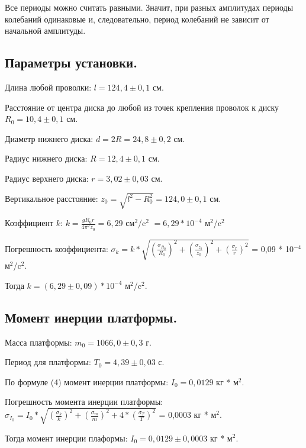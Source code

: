 \documentclass[a4paper]{article}
\begin{document}
    Все периоды можно считать равными. Значит, при разных амплитудах периоды колебаний одинаковые и, следовательно, период колебаний не зависит от начальной амплитуды.

\subsection {Параметры установки.}

\item Длина любой проволки: $l = 124,4 \pm{0,1}$ см.
\item Расстояние от центра диска до любой из точек крепления проволок к диску $R_0 = 10,4 \pm{0,1}$ см.\\
\item Диаметр нижнего диска: $d = 2R = 24,8 \pm{0,2}$ см.
\item Радиус нижнего диска: $R = 12,4 \pm{0,1}$ см.\\
\item Радиус верхнего диска: $r = 3,02 \pm{0,03}$ см.\\
\item Вертикальное расстояние: $z_0 = \sqrt{l^2 - R_0^2} = 124,0 \pm{0,1}$ см.\\

\item Коэффициент $k$: $k = \frac{gR_0r}{4\pi{^2}z_0} = 6,29$ см$^2$/c$^2$ $= 6,29 * 10^{-4}$ м$^2$/c$^2$
\item Погрешность коэффициента: $\sigma_{k} = k * \sqrt{(\frac{\sigma_{R_0}}{R_0})^2 + (\frac{\sigma_{z_0}}{z_0})^2 + (\frac{\sigma_{r}}{r})^2}$ = 0,09 * 10$^{-4}$ м$^2$/c$^2$.\\

\item Тогда $k = (6,29 \pm{0,09}) * 10^{-4}$ м$^2$/c$^2$.\\

\subsection {Момент инерции платформы.}

\item Масса платформы: $m_0 = 1066,0 \pm{0,3}$ г.
\item Период для платформы: $T_0 = 4,39 \pm{0,03}$ с.\\
\item По формуле (4) момент инерции платформы: $I_0 = 0,0129$ кг * м$^{2}$.
\item Погрешность момента инерции платформы: $\sigma_{I_0} = I_0 * \sqrt{(\frac{\sigma_{k}}{k})^2 + (\frac{\sigma_{m}}{m})^2 + 4 * (\frac{\sigma_{T}}{T})^2}$ = 0,0003 кг * м$^{2}$.
\item Тогда момент инерции плаформы: $I_0 = 0,0129 \pm{0,0003}$ кг * м$^{2}$.\\
\end{document}
